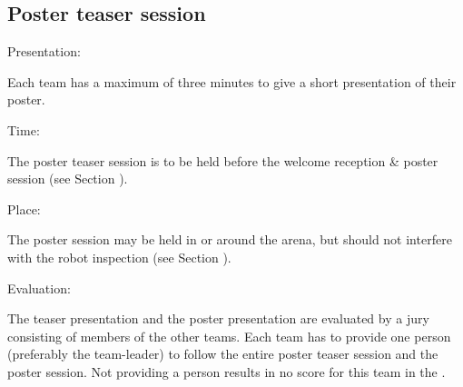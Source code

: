 \subsection{Poster teaser session}
\begin{enumerate}
	{\bf\item Presentation:} Each team has a maximum of three minutes to give a short presentation of their poster.
	{\bf\item Time:} The poster teaser session is to be held before the welcome reception \& poster session (see Section ).
	{\bf\item Place:} The poster session may be held in or around the arena, but should not interfere with the robot inspection (see Section ).
	{\bf\item Evaluation:} The teaser presentation and the poster presentation are evaluated by a jury consisting of members of the other teams. Each team has to provide one person (preferably the team-leader) to follow
	the entire poster teaser session and the poster session. Not providing a person results in no score for this team in the .


\end{enumerate}
